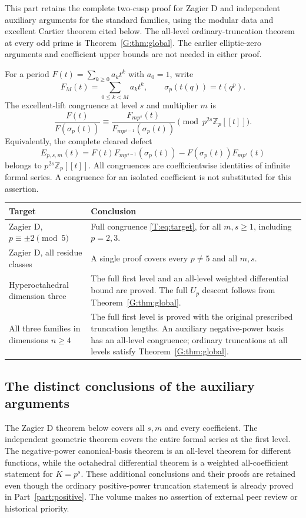 \documentclass[11pt,a4paper]{article}
\theoremstyle{definition}\newtheorem{definition}[theorem]{Definition}
\theoremstyle{remark}\newtheorem{remark}[theorem]{Remark}
\newcommand{\Zp}{\mathbb Z_p}
\numberwithin{equation}{section}
\begin{document}
This part retains the complete two-cusp proof for Zagier D and independent auxiliary arguments for the standard families, using the modular data and excellent Cartier theorem cited below. The all-level ordinary-truncation theorem at every odd prime is
Theorem~\ref{G:thm:global}.  The earlier elliptic-zero
arguments and coefficient upper bounds are not needed in either proof.

For a period $F(t)=\sum_{k\ge0}a_kt^k$ with $a_0=1$, write
\[
 F_M(t)=\sum_{0\le k<M}a_kt^k,
 \qquad \sigma_p(t(q))=t(q^p).
\]
The excellent-lift congruence at level $s$ and multiplier $m$ is
\begin{equation}\label{T:eq:target}
 \frac{F(t)}{F(\sigma_p(t))}
 \equiv\frac{F_{mp^s}(t)}{F_{mp^{s-1}}(\sigma_p(t))}
 \pmod{p^{2s}\Zp[[t]]}.
\end{equation}
Equivalently, the complete cleared defect
\[
 E_{p,s,m}(t)=F(t)F_{mp^{s-1}}(\sigma_p(t))
             -F(\sigma_p(t))F_{mp^s}(t)
\]
belongs to $p^{2s}\Zp[[t]]$.  All congruences are coefficientwise
identities of infinite formal series.  A congruence for an isolated
coefficient is not substituted for this assertion.

\begin{center}\small
\begin{tabular}{@{}>{\raggedright\arraybackslash}p{}>{\raggedright\arraybackslash}p{}@{}}
\toprule
Target&Conclusion\\\midrule
Zagier D, $p\equiv\pm2\pmod5$&Full congruence \eqref{T:eq:target}, for all $m,s\ge1$, including $p=2,3$.\\[3pt]
Zagier D, all residue classes&A single proof covers every $p\ne5$ and all $m,s$.\\[3pt]
Hyperoctahedral dimension three&The full first level and an all-level weighted differential bound are proved.  The full $U_p$ descent follows from Theorem~\ref{G:thm:global}.\\[3pt]
All three families in dimensions $n\ge4$&The full first level is proved with the original prescribed truncation lengths.  An auxiliary negative-power basis has an all-level congruence; ordinary truncations at all levels satisfy Theorem~\ref{G:thm:global}.\\
\bottomrule
\end{tabular}
\end{center}

\subsection{The distinct conclusions of the auxiliary arguments}
The Zagier D theorem below covers all $s,m$ and every coefficient. The independent geometric theorem covers the entire formal series at the first level. The negative-power canonical-basis theorem is an all-level theorem for different functions, while the octahedral differential theorem is a weighted all-coefficient statement for $K=p^s$. These additional conclusions and their proofs are retained even though the ordinary positive-power truncation statement is already proved in Part~\ref{part:positive}. The volume makes no assertion of external peer review or historical priority.
\end{document}
